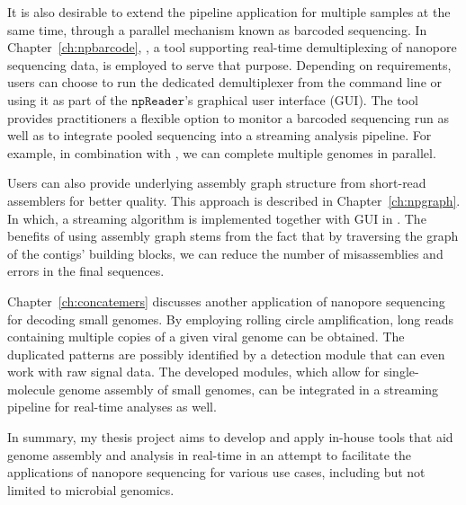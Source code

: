It is also desirable to extend the pipeline application for multiple samples at the same time, through a parallel mechanism known as barcoded sequencing.
In Chapter~\ref{ch:npbarcode}, \npbarcode{}, a tool supporting real-time demultiplexing of nanopore sequencing data, is employed to serve that purpose. 
Depending on requirements, users can choose to run the dedicated demultiplexer from the command line or using it as part of the $\mathtt{npReader}$'s graphical user interface (GUI). The tool provides practitioners a flexible option to monitor a barcoded sequencing run as well as to integrate pooled sequencing into a streaming analysis pipeline. For example, in combination with \npscarf{}, we can complete multiple genomes in parallel.

Users can also provide underlying assembly graph structure from short-read assemblers for better quality. This approach is described in Chapter~\ref{ch:npgraph}. In which, a streaming algorithm is implemented together with GUI in \npgraph{}. The benefits of using assembly graph stems from the fact that by traversing the graph of the contigs' building blocks, we can reduce the number of misassemblies and errors in the final sequences. 

Chapter~\ref{ch:concatemers} discusses another application of nanopore sequencing for decoding small genomes. By employing rolling circle amplification, long reads containing multiple copies of a given viral genome can be obtained. The duplicated patterns are possibly identified by a detection module that can even work with raw signal data. The developed modules, which allow for single-molecule genome assembly of small genomes, can be integrated in a streaming pipeline for real-time analyses as well.

In summary, my thesis project aims to develop and apply in-house tools that aid genome assembly and analysis in real-time in an attempt to facilitate the applications of nanopore sequencing for various use cases, including but not limited to microbial genomics.
